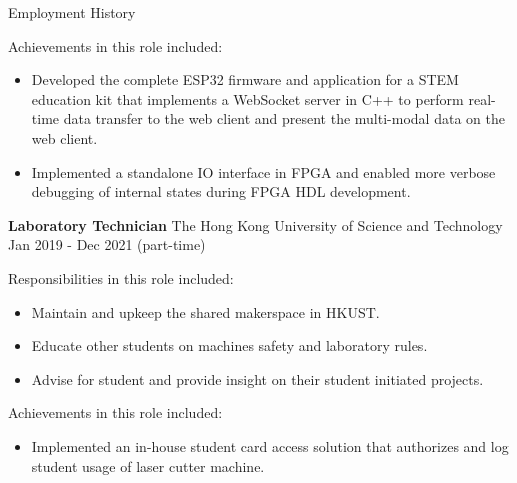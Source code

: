 \documentclass{resume} %
\begin{document}
\begin{rSection}{Employment History}
\begin{minipage}{.8\textwidth}
        Achievements in this role included:
        \begin{itemize}
            \item Developed the complete ESP32 firmware and application for a STEM education kit that implements a WebSocket server in C++ to perform real-time data transfer to the web client and present the multi-modal data on the web client.
            \item Implemented a standalone IO interface in FPGA and enabled more verbose debugging of internal states during FPGA HDL development.
        \end{itemize}
    \end{minipage}%
    
    
    \item \textbf{Laboratory Technician} {The Hong Kong University of Science and Technology} \hfill Jan 2019 - Dec 2021 (part-time) \\
    
    \hspace*{1cm}%
    \begin{minipage}{.8\textwidth}%
        
        Responsibilities in this role included:
        \begin{itemize}
            \item Maintain and upkeep the shared makerspace in HKUST.
            \item Educate other students on machines safety and laboratory rules.
            \item Advise for student and provide insight on their student initiated projects.
        \end{itemize}
        
        Achievements in this role included:
        \begin{itemize}
            \item Implemented an in-house student card access solution that authorizes and log student usage of laser cutter machine.
        \end{itemize}
        
    \end{minipage}%
\end{rSection}
\end{document}
